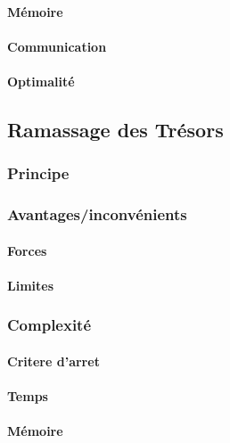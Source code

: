 \documentclass[a4paper, 10pt]{article}
\begin{document}
\paragraph{Mémoire}

\paragraph{Communication}

\paragraph{Optimalité}

\subsection{Ramassage des Trésors}

\subsubsection{Principe}

\subsubsection{Avantages/inconvénients}

\paragraph{Forces}

\paragraph{Limites}

\subsubsection{Complexité}

\paragraph{Critere d'arret}

\paragraph{Temps}

\paragraph{Mémoire}
\end{document}
